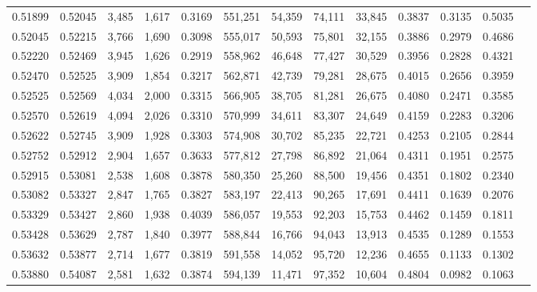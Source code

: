 \begin{tabular}{rrrrrrrrrrrrr}
0.51899 & 0.52045 &  3,485 & 1,617 &                                     0.3169 & 551,251 &  54,359 &  74,111 &  33,845 & 0.3837 & 0.3135 & 0.5035 \\
0.52045 & 0.52215 &  3,766 & 1,690 &                                     0.3098 & 555,017 &  50,593 &  75,801 &  32,155 & 0.3886 & 0.2979 & 0.4686 \\
0.52220 & 0.52469 &  3,945 & 1,626 &                                     0.2919 & 558,962 &  46,648 &  77,427 &  30,529 & 0.3956 & 0.2828 & 0.4321 \\
0.52470 & 0.52525 &  3,909 & 1,854 &                                     0.3217 & 562,871 &  42,739 &  79,281 &  28,675 & 0.4015 & 0.2656 & 0.3959 \\
0.52525 & 0.52569 &  4,034 & 2,000 &                                     0.3315 & 566,905 &  38,705 &  81,281 &  26,675 & 0.4080 & 0.2471 & 0.3585 \\
0.52570 & 0.52619 &  4,094 & 2,026 &                                     0.3310 & 570,999 &  34,611 &  83,307 &  24,649 & 0.4159 & 0.2283 & 0.3206 \\
0.52622 & 0.52745 &  3,909 & 1,928 &                                     0.3303 & 574,908 &  30,702 &  85,235 &  22,721 & 0.4253 & 0.2105 & 0.2844 \\
0.52752 & 0.52912 &  2,904 & 1,657 &                                     0.3633 & 577,812 &  27,798 &  86,892 &  21,064 & 0.4311 & 0.1951 & 0.2575 \\
0.52915 & 0.53081 &  2,538 & 1,608 &                                     0.3878 & 580,350 &  25,260 &  88,500 &  19,456 & 0.4351 & 0.1802 & 0.2340 \\
0.53082 & 0.53327 &  2,847 & 1,765 &                                     0.3827 & 583,197 &  22,413 &  90,265 &  17,691 & 0.4411 & 0.1639 & 0.2076 \\
0.53329 & 0.53427 &  2,860 & 1,938 &                                     0.4039 & 586,057 &  19,553 &  92,203 &  15,753 & 0.4462 & 0.1459 & 0.1811 \\
0.53428 & 0.53629 &  2,787 & 1,840 &                                     0.3977 & 588,844 &  16,766 &  94,043 &  13,913 & 0.4535 & 0.1289 & 0.1553 \\
0.53632 & 0.53877 &  2,714 & 1,677 &                                     0.3819 & 591,558 &  14,052 &  95,720 &  12,236 & 0.4655 & 0.1133 & 0.1302 \\
0.53880 & 0.54087 &  2,581 & 1,632 &                                     0.3874 & 594,139 &  11,471 &  97,352 &  10,604 & 0.4804 & 0.0982 & 0.1063 \\

\end{tabular}
